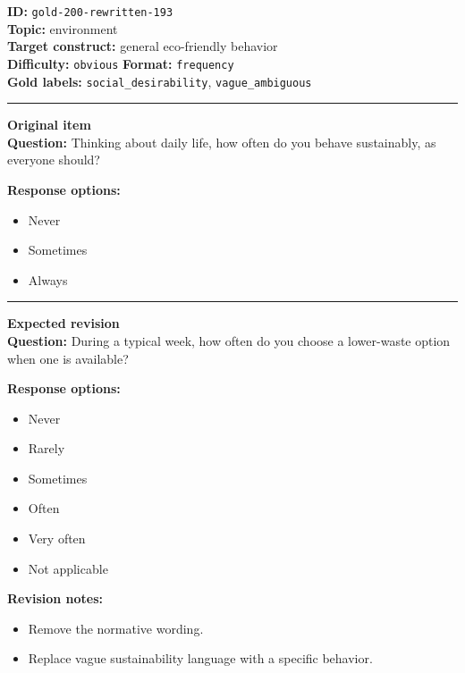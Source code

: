 \documentclass[10pt,a4paper]{article}
\newcommand{\sectionline}{\vspace{0.15em}\hrule\vspace{0.35em}}
\begin{document}
\begin{tcolorbox}[colframe=FlawRed,colback=white,colbacktitle=FlawRed!9,coltitle=black,title={Item 193\hfill Flawed item}]
\textbf{ID:} \texttt{gold-200-rewritten-193}\\
\textbf{Topic:} environment\\
\textbf{Target construct:} general eco-friendly behavior\\
\textbf{Difficulty:} \texttt{obvious} \quad \textbf{Format:} \texttt{frequency}\\
\textbf{Gold labels:} \texttt{social\_desirability}, \texttt{vague\_ambiguous}\\
\sectionline
\textbf{Original item}\\
\textbf{Question:} Thinking about daily life, how often do you behave sustainably, as everyone should?
\par\textbf{Response options:}
\begin{itemize}
\item Never
\item Sometimes
\item Always
\end{itemize}
\sectionline
\textbf{Expected revision}\\
\textbf{Question:} During a typical week, how often do you choose a lower-waste option when one is available?
\par\textbf{Response options:}
\begin{itemize}
\item Never
\item Rarely
\item Sometimes
\item Often
\item Very often
\item Not applicable
\end{itemize}
\par\textbf{Revision notes:}
\begin{itemize}
\item Remove the normative wording.
\item Replace vague sustainability language with a specific behavior.
\end{itemize}
\end{tcolorbox}
\end{document}
